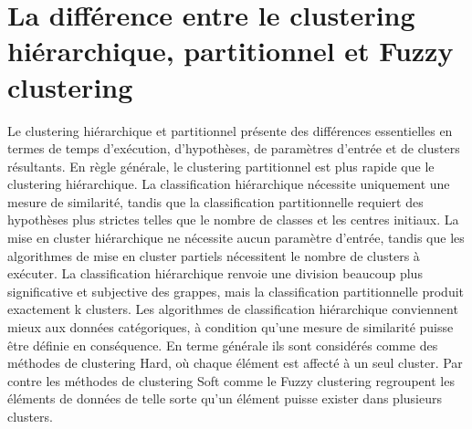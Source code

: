\section{La différence entre le clustering hiérarchique, partitionnel et Fuzzy clustering}
Le clustering hiérarchique et partitionnel présente des différences essentielles en termes de temps d’exécution, d’hypothèses, de paramètres d’entrée et de clusters résultants. En règle générale, le clustering partitionnel est plus rapide que le clustering hiérarchique. La classification hiérarchique nécessite uniquement une mesure de similarité, tandis que la classification partitionnelle requiert des hypothèses plus strictes telles que le nombre de classes et les centres initiaux. La mise en cluster hiérarchique ne nécessite aucun paramètre d’entrée, tandis que les algorithmes de mise en cluster partiels nécessitent le nombre de clusters à exécuter. La classification hiérarchique renvoie une division beaucoup plus significative et subjective des grappes, mais la classification partitionnelle produit exactement k clusters. Les algorithmes de classification hiérarchique conviennent mieux aux données catégoriques, à condition qu’une mesure de similarité puisse être définie en conséquence. En terme générale ils sont considérés comme des méthodes de clustering Hard, où chaque élément est affecté à un seul cluster. Par contre les méthodes de clustering Soft comme le Fuzzy clustering regroupent les éléments de données de telle sorte qu'un élément puisse exister dans plusieurs clusters.
